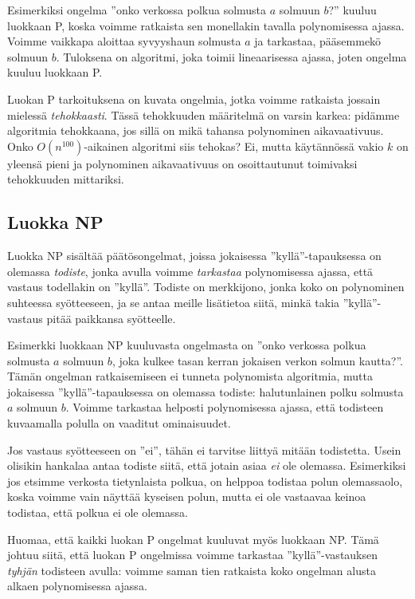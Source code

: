 Esimerkiksi ongelma ''onko verkossa polkua solmusta $a$ solmuun $b$?''
kuuluu luokkaan P, koska voimme ratkaista sen monellakin tavalla
polynomisessa ajassa.
Voimme vaikkapa aloittaa syvyyshaun solmusta $a$ ja tarkastaa,
pääsemmekö solmuun $b$.
Tuloksena on algoritmi, joka toimii lineaarisessa ajassa,
joten ongelma kuuluu luokkaan P.

Luokan P tarkoituksena on kuvata ongelmia, jotka voimme
ratkaista jossain mielessä \emph{tehokkaasti}.
Tässä tehokkuuden määritelmä on varsin karkea:
pidämme algoritmia tehokkaana, jos sillä on mikä tahansa
polynominen aikavaativuus.
Onko $O(n^{100})$-aikainen algoritmi siis tehokas?
Ei, mutta käytännössä vakio $k$ on yleensä pieni ja
polynominen aikavaativuus on osoittautunut
toimivaksi tehokkuuden mittariksi.

\subsection{Luokka NP}


Luokka NP sisältää päätösongelmat, joissa jokaisessa
''kyllä''-tapauksessa on olemassa
\emph{todiste}, jonka avulla voimme
\emph{tarkastaa} polynomisessa ajassa, että vastaus
todellakin on ''kyllä''.
Todiste on merkkijono, jonka koko on polynominen
suhteessa syötteeseen,
ja se antaa meille lisätietoa siitä,
minkä takia ''kyllä''-vastaus pitää paikkansa syötteelle.

Esimerkki luokkaan NP kuuluvasta ongelmasta on
''onko verkossa polkua solmusta $a$ solmuun $b$,
joka kulkee tasan kerran jokaisen verkon solmun kautta?''.
Tämän ongelman ratkaisemiseen ei tunneta polynomista algoritmia,
mutta jokaisessa ''kyllä''-tapauksessa on olemassa todiste:
halutunlainen polku solmusta $a$ solmuun $b$.
Voimme tarkastaa helposti polynomisessa ajassa,
että todisteen kuvaamalla polulla on vaaditut ominaisuudet.

Jos vastaus syötteeseen on ''ei'', tähän ei tarvitse
liittyä mitään todistetta.
Usein olisikin hankalaa antaa todiste siitä, että jotain
asiaa \emph{ei} ole olemassa.
Esimerkiksi jos etsimme verkosta tietynlaista polkua,
on helppoa todistaa polun olemassaolo,
koska voimme vain näyttää kyseisen polun,
mutta ei ole vastaavaa keinoa todistaa, että polkua ei ole olemassa.

Huomaa, että kaikki luokan P ongelmat kuuluvat myös
luokkaan NP. Tämä johtuu siitä, että luokan P ongelmissa
voimme tarkastaa ''kyllä''-vastauksen
\emph{tyhjän} todisteen avulla: voimme saman tien ratkaista
koko ongelman alusta alkaen polynomisessa ajassa.

